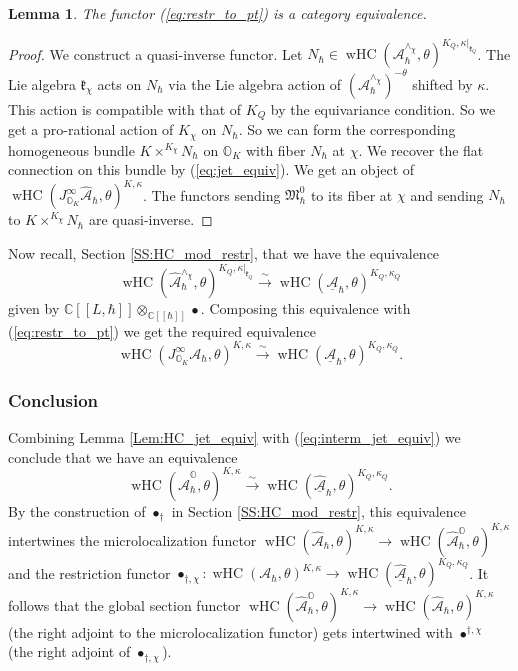 \documentclass[12pt]{amsart}
\newcommand{\C}{\mathbb{C}}
\newcommand{\A}{\mathcal{A}}
\newcommand{\Orb}{\mathbb{O}}
\newcommand{\kf}{\mathfrak{k}}
\newcommand{\jet}{J^\infty}
\newcommand{\wHC}{\operatorname{wHC}}
\newtheorem{Lem}[Thm]{Lemma}
\theoremstyle{definition}
\numberwithin{equation}{section}
\begin{document}
\begin{Lem}\label{Lem:restr_pt_equiv}
The functor (\ref{eq:restr_to_pt})  is a category equivalence.
\end{Lem}
\begin{proof}
We construct a quasi-inverse functor. Let $N_\hbar\in \wHC(\A_\hbar^{\wedge_\chi},\theta)^{K_Q,\kappa|_{\kf_Q}}$. The Lie algebra
$\mathfrak{k}_\chi$ acts on $N_\hbar$ via the Lie algebra action of $(\A_\hbar^{\wedge_\chi})^{-\theta}$
shifted by $\kappa$.
This action is compatible with that of $K_Q$ by the equivariance condition. So we get a pro-rational
action of $K_\chi$ on $N_\hbar$. So
we can form the corresponding homogeneous bundle $K\times^{K_\chi}N_\hbar$ on $\Orb_K$ with fiber $N_\hbar$ at $\chi$.
We recover the flat connection on this bundle
by (\ref{eq:jet_equiv}). We get an object of
$\wHC(\jet_{\Orb_K}\hat{\A}_\hbar,\theta)^{K,\kappa}$. The functors sending $\mathfrak{M}_\hbar^0$ to its fiber at $\chi$ and sending $N_\hbar$ to $K\times^{K_\chi}N_\hbar$ are quasi-inverse.
\end{proof}

Now recall, Section \ref{SS:HC_mod_restr}, that we have the equivalence
$$\wHC(\hat{\A}_\hbar^{\wedge_\chi},\theta)^{K_Q,\kappa|_{\kf_Q}}\xrightarrow{\sim}
\wHC(\underline{\A}_\hbar,\theta)^{K_Q,\kappa_Q}$$
given by $\C[[L,\hbar]]\otimes_{\C[[\hbar]]}\bullet$.
Composing this equivalence with
(\ref{eq:restr_to_pt}) we get the required equivalence
\begin{equation}\label{eq:interm_jet_equiv}
\wHC(\jet_{\Orb_K}\A_\hbar,\theta)^{K,\kappa}\xrightarrow{\sim}
\wHC(\underline{\A}_\hbar,\theta)^{K_Q,\kappa_Q}.
\end{equation}

\subsubsection{Conclusion}\label{SSS_conclusion_microloc}
Combining Lemma \ref{Lem:HC_jet_equiv} with (\ref{eq:interm_jet_equiv})  we conclude that we have an equivalence
\begin{equation}\label{eq:final_jet_equiv}
\wHC(\hat{\A}_\hbar^{\Orb},\theta)^{K,\kappa}\xrightarrow{\sim}
\wHC(\underline{\hat{\A}}_\hbar,\theta)^{K_Q,\kappa_Q}.
\end{equation}
By the construction of $\bullet_\dagger$ in Section \ref{SS:HC_mod_restr},  this equivalence intertwines the microlocalization functor
$\wHC(\hat{\A}_\hbar,\theta)^{K,\kappa}\rightarrow \wHC(\hat{\A}_\hbar^\Orb,\theta)^{K,\kappa}$
and the restriction functor $\bullet_{\dagger,\chi}:
\wHC(\A_\hbar,\theta)^{ K,\kappa}\rightarrow \wHC(\underline{\hat{\A}}_\hbar,\theta)^{K_Q,\kappa_Q}$.
It follows that the global section functor
$\wHC(\hat{\A}^\Orb_\hbar,\theta)^{K,\kappa}\rightarrow \wHC(\hat{\A}_\hbar, \theta)^{K,\kappa}$
(the right adjoint to the microlocalization functor)
gets intertwined with $\bullet^{\dagger,\chi}$ (the right adjoint of $\bullet_{\dagger,\chi}$).
\end{document}
